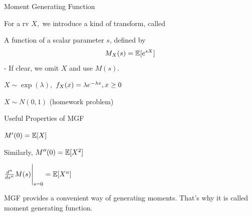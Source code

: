\documentclass[fleqn,aspectratio=169]{beamer}
\begin{document}
\begin{frame}{Moment Generating Function}

{
\small
\plitemsep 0.1in
\bci 
\item<1-> For a rv $X,$ we introduce a kind of transform, called  

\item<2-> A function of a scalar parameter $s$, defined by
$$
M_X(s) = \mathbb{E}[ e^{sX} ]
$$
- If clear, we omit $X$ and use $M(s).$
\eci 
}
{
\small
\plitemsep 0.1in
\bci 
\item<4->[Ex1)] $X \sim \exp(\lambda),$ $f_X(x) = \lambda e^{-\lambda x}, x\ge 0$

\item<5->[Ex2)] $X \sim N(0,1)$ (homework problem)

\eci 
}

\end{frame}

\begin{frame}{Useful Properties of MGF}

\plitemsep 0.1in
\bce 
\item<1-> $M'(0) = \mathbb{E}[ X ]$

\item<3-> Similarly, $M''(0) = \mathbb{E}[ X^2 ]$

\item<4-> $\frac{d^n}{ds^n} M(s) \Bigg |_{s=0} = \mathbb{E}[ X^n ]$

\item<5-> MGF provides a convenient way of generating moments. That's why it is called moment generating function. 

\ece 


\end{frame}
\end{document}
